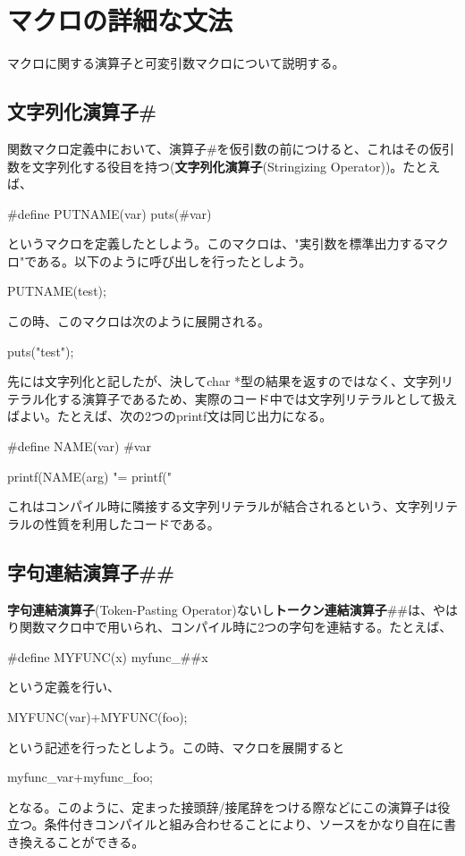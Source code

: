 \section{マクロの詳細な文法}
マクロに関する演算子と可変引数マクロについて説明する。
\subsection{文字列化演算子\#}
関数マクロ定義中において、演算子\#を仮引数の前につけると、これはその仮引数を文字列化する役目を持つ(\textbf{文字列化演算子}(Stringizing Operator))。たとえば、
\begin{code}
#define PUTNAME(var) puts(#var)
\end{code}
というマクロを定義したとしよう。このマクロは、"実引数を標準出力するマクロ"である。以下のように呼び出しを行ったとしよう。
\begin{code}
PUTNAME(test);
\end{code}
この時、このマクロは次のように展開される。
\begin{code}
puts("test");
\end{code}

先には文字列化と記したが、決してchar *型の結果を返すのではなく、文字列リテラル化する演算子であるため、実際のコード中では文字列リテラルとして扱えばよい。たとえば、次の2つのprintf文は同じ出力になる。
\begin{code}
#define NAME(var) #var

printf(NAME(arg) "=%
printf("%
\end{code}
これはコンパイル時に隣接する文字列リテラルが結合されるという、文字列リテラルの性質を利用したコードである。

\subsection{字句連結演算子\#\#}
\textbf{字句連結演算子}(Token-Pasting Operator)ないし\textbf{トークン連結演算子}\#\#は、やはり関数マクロ中で用いられ、コンパイル時に2つの字句を連結する。たとえば、
\begin{code}
#define MYFUNC(x) myfunc_##x
\end{code}
という定義を行い、
\begin{code}
MYFUNC(var)+MYFUNC(foo);
\end{code}
という記述を行ったとしよう。この時、マクロを展開すると
\begin{code}
myfunc_var+myfunc_foo;
\end{code}
となる。このように、定まった接頭辞/接尾辞をつける際などにこの演算子は役立つ。条件付きコンパイルと組み合わせることにより、ソースをかなり自在に書き換えることができる。

